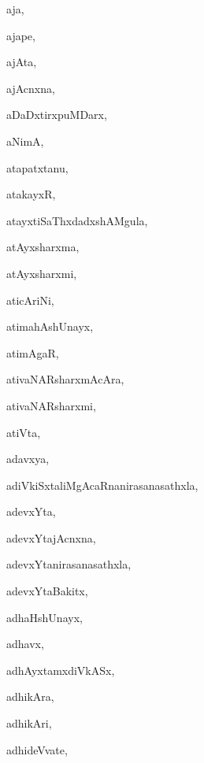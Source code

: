 \begin{multicols}{3}
{\noindent
{aja}, \pageref{aja}

\noindent
{ajape}, \pageref{ajape}

\noindent
{ajAta}, \pageref{ajAta}

\noindent
{ajAcnxna}, \pageref{ajAcnxna}

\noindent
{aDaDxtirxpuMDarx}, \pageref{aDaDxtirxpuMDarx}

\noindent
{aNimA}, \pageref{aNimA}

\noindent
{atapatxtanu}, \pageref{atapatxtanu}

\noindent
{atakayxR}, \pageref{atakayxR}

\noindent
{atayxtiSaThxdadxshAMgula}, \pageref{atayxtiSaThxdadxshAMgula}

\noindent
{atAyxsharxma}, \pageref{atAyxsharxma}

\noindent
{atAyxsharxmi}, \pageref{atAyxsharxmi}

\noindent
{aticAriNi}, \pageref{aticAriNi}

\noindent
{atimahAshUnayx}, \pageref{atimahAshUnayx}

\noindent
{atimAgaR}, \pageref{atimAgaR}

\noindent
{ativaNARsharxmAcAra}, \pageref{ativaNARsharxmAcAra}

\noindent
{ativaNARsharxmi}, \pageref{ativaNARsharxmi}

\noindent
{atiVta}, \pageref{atiVta}

\noindent
{adavxya}, \pageref{adavxya}

\noindent
{adiVkiSxtaliMgAcaRnanirasanasathxla}, \pageref{adiVkiSxtaliMgAcaRnanirasanasathxla}

\noindent
{adevxYta}, \pageref{adevxYta}

\noindent
{adevxYtajAcnxna}, \pageref{adevxYtajAcnxna}

\noindent
{adevxYtanirasanasathxla}, \pageref{adevxYtanirasanasathxla}

\noindent
{adevxYtaBakitx}, \pageref{adevxYtaBakitx}

\noindent
{adhaHshUnayx}, \pageref{adhaHshUnayx}

\noindent
{adhavx}, \pageref{adhavx}

\noindent
{adhAyxtamxdiVkASx}, \pageref{adhAyxtamxdiVkASx}

\noindent
{adhikAra}, \pageref{adhikAra}

\noindent
{adhikAri}, \pageref{adhikAri}

\noindent
{adhideVvate}, \pageref{adhideVvate}

}
\end{multicols}
